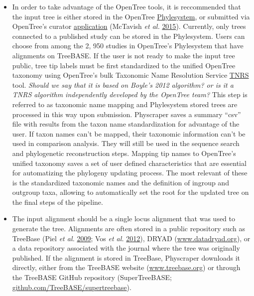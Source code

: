 \documentclass[]{article}
\begin{document}
\begin{itemize}
\item
  In order to take advantage of the OpenTree tools, it is reccommended that the input tree is either stored in the
  OpenTree \href{https://github.com/opentreeoflife/phylesystem}{Phylesystem}, or submitted via OpenTree's curator \href{https://tree.opentreeoflife.org/curator}{application} (McTavish \emph{et al.} \protect\hyperlink{ref-mctavish2015phylesystem}{2015}).
  Currently, only trees connected to a published study can be stored in the Phylesystem.
  Users can choose from among the 2, 950 studies in OpenTree's Phylesystem that have alignments on TreeBASE.
  If the user is not ready to make the input tree public, tree tip labels must be first standardized to the unified OpenTree taxonomy using OpenTree's bulk Taxonomic Name Resolution Service \href{https://tree.opentreeoflife.org/curator/tnrs/}{TNRS} tool. \emph{Should we say that it is based on Boyle's 2012 algorithm? or is it a TNRS algorithm independently developed by the OpenTree team?}
  This step is referred to as taxonomic name mapping and Phylesystem stored trees are processed in this way upon submission.
  Physcraper saves a summary ``csv'' file with results from the taxon name standardization for advantage of the user.
  If taxon names can't be mapped, their taxonomic information can't be used in comparison analysis. They will still be used in the sequence search and phylogenetic reconstruction steps.
  Mapping tip names to OpenTree's unified taxonomy saves a set of user defined characteristics
  that are essential for automatizing the phylogeny updating process. The most relevant of these is the standardized taxonomic names and the definition of ingroup and outgroup taxa, allowing to automatically set the root for the updated tree on the final steps of the pipeline.
\item
  The input alignment should be a single locus alignment that was used to generate the tree. Alignments are often stored in a public repository such as TreeBase (Piel \emph{et al.} \protect\hyperlink{ref-piel2009treebase}{2009}; Vos \emph{et al.} \protect\hyperlink{ref-vos2012nexml}{2012}),
  DRYAD (\href{http://datadryad.org/}{www.datadryad.org}), or a data repository associated with the journal where the tree was originally published.
  If the alignment is stored in TreeBase, Physcraper downloads it directly,
  either from the TreeBASE website (\href{https://treebase.org/}{www.treebase.org})
  or through the TreeBASE GitHub repository (SuperTreeBASE; \href{https://github.com/TreeBASE/supertreebase}{github.com/TreeBASE/supertreebase}).

\end{itemize}
\end{document}
